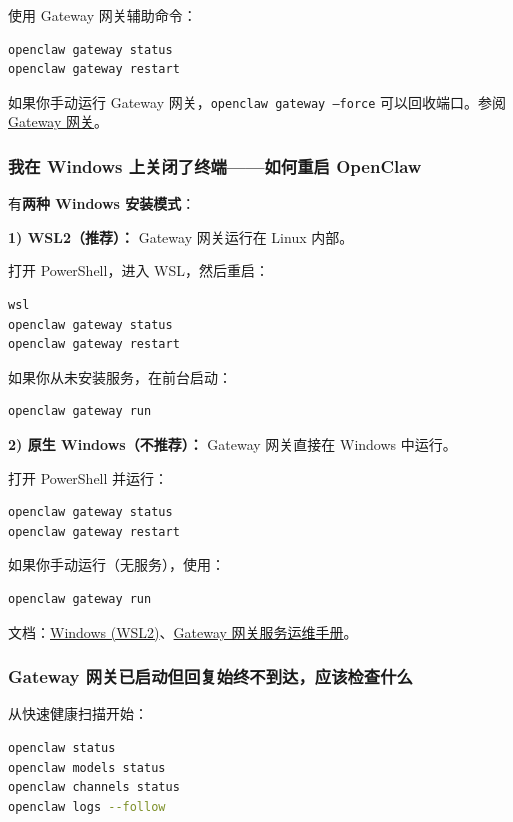 使用 Gateway 网关辅助命令：

\begin{lstlisting}[language=bash]
openclaw gateway status
openclaw gateway restart
\end{lstlisting}


如果你手动运行 Gateway 网关，\texttt{openclaw gateway --force} 可以回收端口。参阅 \href{/gateway}{Gateway 网关}。

\subsubsection{我在 Windows 上关闭了终端——如何重启 OpenClaw}


有\textbf{两种 Windows 安装模式}：

\textbf{1) WSL2（推荐）：} Gateway 网关运行在 Linux 内部。

打开 PowerShell，进入 WSL，然后重启：

\begin{lstlisting}
wsl
openclaw gateway status
openclaw gateway restart
\end{lstlisting}


如果你从未安装服务，在前台启动：

\begin{lstlisting}[language=bash]
openclaw gateway run
\end{lstlisting}


\textbf{2) 原生 Windows（不推荐）：} Gateway 网关直接在 Windows 中运行。

打开 PowerShell 并运行：

\begin{lstlisting}
openclaw gateway status
openclaw gateway restart
\end{lstlisting}


如果你手动运行（无服务），使用：

\begin{lstlisting}
openclaw gateway run
\end{lstlisting}


文档：\href{/platforms/windows}{Windows (WSL2)}、\href{/gateway}{Gateway 网关服务运维手册}。

\subsubsection{Gateway 网关已启动但回复始终不到达，应该检查什么}


从快速健康扫描开始：

\begin{lstlisting}[language=bash]
openclaw status
openclaw models status
openclaw channels status
openclaw logs --follow
\end{lstlisting}


